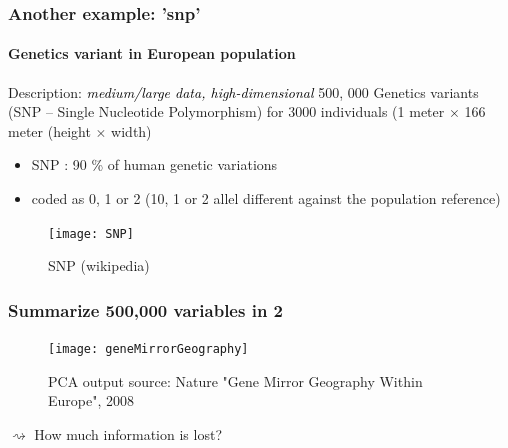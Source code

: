 \documentclass{beamer}\usepackage[]{graphicx}\usepackage[]{color}
\begin{document}
\begin{frame}[fragile]
  \frametitle{Another example: 'snp'}
  \framesubtitle{Genetics variant in European population}

\begin{block}{Description: \textcolor{black}{\it medium/large data, high-dimensional}}
500, 000 Genetics variants (SNP -- Single Nucleotide Polymorphism) for  3000 individuals
(1 meter $\times$ 166 meter (height $\times$ width)
\end{block}

\begin{multicols}{2}
  \begin{itemize}
  \item SNP : 90 \% of human genetic variations
  \item coded as 0, 1 or 2 (10, 1 or 2 allel different against the population reference)
  \end{itemize}

  \begin{figure}
    \centering
     \texttt{[image: SNP]}   
    \caption{SNP (wikipedia)}
  \end{figure}
\end{multicols}

\end{frame}

\begin{frame}
  \frametitle{Summarize 500,000 variables in 2}

  \begin{figure}
    \centering
      \texttt{[image: geneMirrorGeography]}
    \caption{PCA output {\tiny source: Nature "Gene  Mirror Geography Within  Europe", 2008}}
  \end{figure}

  $\rightsquigarrow$ How much information is lost?

\end{frame}
\end{document}
